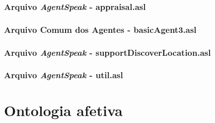 \subsection*{Arquivo \emph{AgentSpeak} - appraisal.asl}


\subsection*{Arquivo Comum dos Agentes - basicAgent3.asl}


%
%
\subsection*{Arquivo \emph{AgentSpeak} - supportDiscoverLocation.asl}


\subsection*{Arquivo \emph{AgentSpeak} - util.asl}



\chapter{Ontologia afetiva}


%



